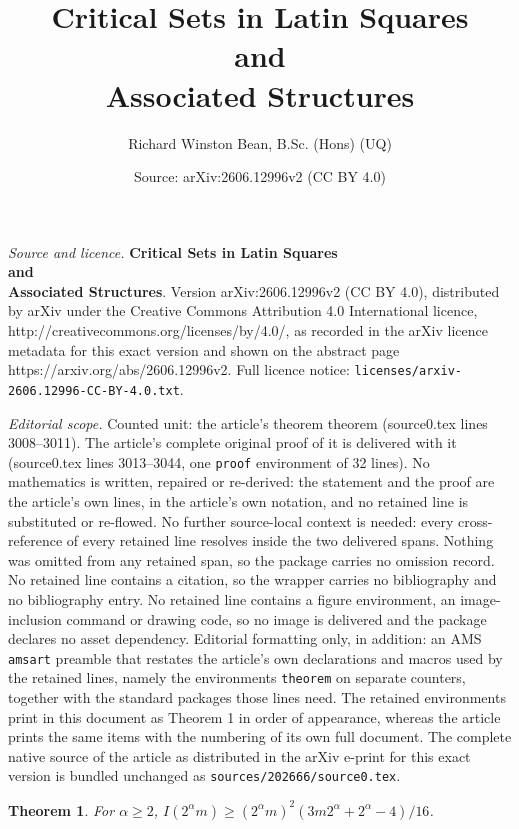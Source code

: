 \documentclass[10pt,a4paper]{amsart}
\title{{\bf Critical Sets in Latin Squares\\ and\\ Associated Structures}}
\author{Richard Winston Bean, B.Sc. (Hons) (UQ)}
\date{Source: arXiv:2606.12996v2 (CC BY 4.0)}
\newtheorem{theorem}{Theorem}
\begin{document}
\maketitle

\noindent\emph{Source and licence.} {\bf Critical Sets in Latin Squares\\ and\\ Associated Structures}. Version arXiv:2606.12996v2 (CC BY 4.0), distributed by arXiv under the Creative Commons Attribution 4.0 International licence, http://creativecommons.org/licenses/by/4.0/, as recorded in the arXiv licence metadata for this exact version and shown on the abstract page https://arxiv.org/abs/2606.12996v2. Full licence notice: \texttt{licenses/arxiv-2606.12996-CC-BY-4.0.txt}.\par\smallskip

\noindent\textit{Editorial scope.} Counted unit: the article's theorem theorem (source0.tex lines 3008--3011). The article's complete original proof of it is delivered with it (source0.tex lines 3013--3044, one \texttt{proof} environment of 32 lines). No mathematics is written, repaired or re-derived: the statement and the proof are the article's own lines, in the article's own notation, and no retained line is substituted or re-flowed.  No further source-local context is needed: every cross-reference of every retained line resolves inside the two delivered spans.  Nothing was omitted from any retained span, so the package carries no omission record.  No retained line contains a citation, so the wrapper carries no bibliography and no bibliography entry.  No retained line contains a figure environment, an image-inclusion command or drawing code, so no image is delivered and the package declares no asset dependency.  Editorial formatting only, in addition: an AMS \texttt{amsart} preamble that restates the article's own declarations and macros used by the retained lines, namely the environments \texttt{theorem} on separate counters, together with the standard packages those lines need.  The retained environments print in this document as Theorem 1 in order of appearance, whereas the article prints the same items with the numbering of its own full document.  The complete native source of the article as distributed in the arXiv e-print for this exact version is bundled unchanged as \texttt{sources/202666/source0.tex}.
\begin{theorem}
For $\alpha \geq 2$,
$I(2^\alpha m) \geq (2^\alpha m)^2 (3m 2^\alpha+2^\alpha-4)/16$.
\end{theorem}
\end{document}
